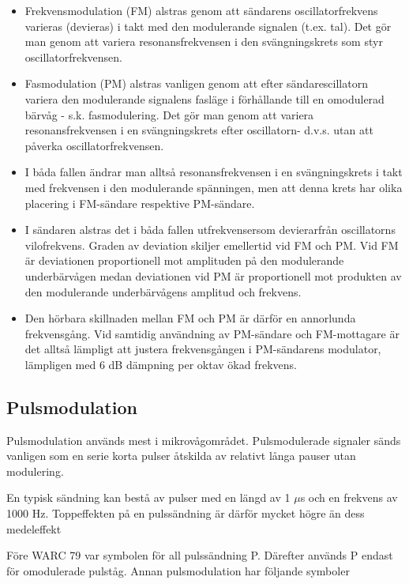 \begin{itemize}
\item Frekvensmodulation (FM) alstras genom att sändarens oscillatorfrekvens
varieras (devieras) i takt med den modulerande signalen (t.ex. tal). Det gör man
genom att variera resonansfrekvensen i den svängningskrets som styr
oscillatorfrekvensen.

\item Fasmodulation (PM) alstras vanligen genom att efter sändarescillatorn
variera den modulerande signalens fasläge i förhållande till en omodulerad
bärvåg - s.k. fasmodulering. Det gör man genom att variera resonansfrekvensen i
en svängningskrets efter oscillatorn- d.v.s. utan att påverka
oscillatorfrekvensen.

\item I båda fallen ändrar man alltså resonansfrekvensen i en svängningskrets i
takt med frekvensen i den modulerande spänningen, men att denna krets har olika
placering i FM-sändare respektive PM-sändare.

\item I sändaren alstras det i båda fallen utfrekvensersom devierarfrån
oscillatorns vilofrekvens. Graden av deviation skiljer emellertid vid FM och PM.
Vid FM är deviationen proportionell mot amplituden på den modulerande
underbärvågen medan deviationen vid PM är proportionell mot produkten av den
modulerande underbärvågens amplitud och frekvens.

\item Den hörbara skillnaden mellan FM och PM är därför en annorlunda
frekvensgång. Vid samtidig användning av PM-sändare och FM-mottagare är det
alltså lämpligt att justera frekvensgången i PM-sändarens modulator, lämpligen
med 6 dB dämpning per oktav ökad frekvens.
\end{itemize}

\subsection{Pulsmodulation}

Pulsmodulation används mest i mikrovågområdet. Pulsmodulerade signaler sänds
vanligen som en serie korta pulser åtskilda av relativt långa pauser utan
modulering.

En typisk sändning kan bestå av pulser med en längd av 1 \(\mu\)s och en
frekvens av 1000 Hz. Toppeffekten på en pulssändning är därför mycket högre än
dess medeleffekt

Före WARC 79 var symbolen för all pulssändning P. Därefter används P endast för
omodulerade pulståg. Annan pulsmodulation har följande symboler

